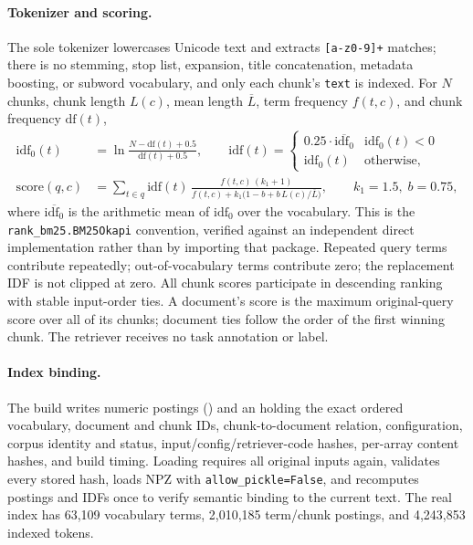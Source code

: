 \paragraph{Tokenizer and scoring.}
The sole tokenizer lowercases Unicode text and extracts \texttt{[a-z0-9]+} matches; there is no stemming, stop list, expansion, title concatenation, metadata boosting, or subword vocabulary, and only each chunk's \texttt{text} is indexed. For $N$ chunks, chunk length $L(c)$, mean length $\overline{L}$, term frequency $f(t,c)$, and chunk frequency $\mathrm{df}(t)$,
\begin{align}
\mathrm{idf}_0(t)&=\ln\frac{N-\mathrm{df}(t)+0.5}{\mathrm{df}(t)+0.5},\qquad
\mathrm{idf}(t)=\begin{cases}0.25\cdot\overline{\mathrm{idf}_0} & \mathrm{idf}_0(t)<0\\ \mathrm{idf}_0(t)&\text{otherwise,}\end{cases}\\
\mathrm{score}(q,c)&=\sum_{t\in q}\mathrm{idf}(t)\,\frac{f(t,c)\,(k_1+1)}{f(t,c)+k_1\bigl(1-b+b\,L(c)/\overline{L}\bigr)},\qquad k_1=1.5,\;b=0.75,
\end{align}
where $\overline{\mathrm{idf}_0}$ is the arithmetic mean of $\mathrm{idf}_0$ over the vocabulary. This is the \texttt{rank\_bm25.BM25Okapi} convention, verified against an independent direct implementation rather than by importing that package. Repeated query terms contribute repeatedly; out-of-vocabulary terms contribute zero; the replacement IDF is not clipped at zero. All chunk scores participate in descending ranking with stable input-order ties. A document's score is the maximum original-query score over all of its chunks; document ties follow the order of the first winning chunk. The retriever receives no task annotation or label.

\paragraph{Index binding.}
The build writes numeric postings () and an  holding the exact ordered vocabulary, document and chunk IDs, chunk-to-document relation, configuration, corpus identity and status, input/config/retriever-code hashes, per-array content hashes, and build timing. Loading requires all original inputs again, validates every stored hash, loads NPZ with \texttt{allow\_pickle=False}, and recomputes postings and IDFs once to verify semantic binding to the current text. The real index has 63,109 vocabulary terms, 2,010,185 term/chunk postings, and 4,243,853 indexed tokens.

